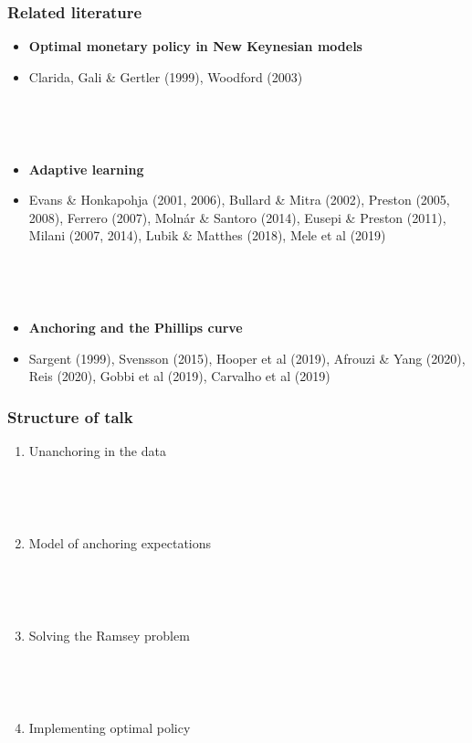 \documentclass[10pt]{beamer}
\begin{document}
\begin{frame}
	\frametitle{Related literature}

\begin{itemize}
\item \textbf{Optimal monetary policy in New Keynesian models}
\item[] Clarida, Gali \& Gertler (1999), Woodford (2003)

\

\

\item \textbf{Adaptive learning}
\item[] Evans \& Honkapohja (2001, 2006), Bullard \& Mitra (2002), Preston (2005, 2008), Ferrero (2007), Moln\'ar \& Santoro (2014), Eusepi \& Preston (2011), Milani (2007, 2014), Lubik \& Matthes (2018), Mele et al (2019)

\

\

\item \textbf{Anchoring and the Phillips curve} 
\item[] Sargent (1999), Svensson (2015), Hooper et al (2019), Afrouzi \& Yang (2020), Reis (2020), Gobbi et al (2019), Carvalho et al (2019)
\end{itemize}



\end{frame}

\begin{frame}
	\frametitle{Structure of talk}

\begin{enumerate}
\item Unanchoring in the data

\

\

\item Model of anchoring expectations

\

\

\item Solving the Ramsey problem

\

\

\item Implementing optimal policy
\end{enumerate}



\end{frame}
\end{document}
